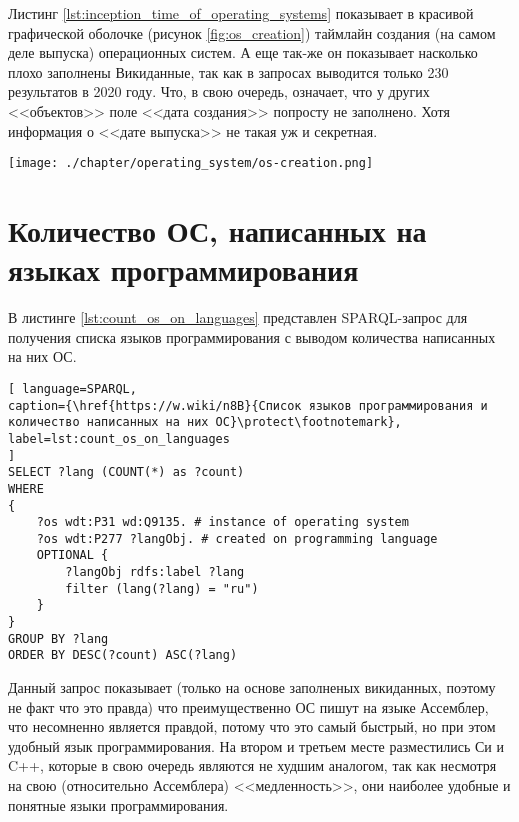Листинг \ref{lst:inception_time_of_operating_systems} показывает в красивой графической оболочке (рисунок \ref{fig:os_creation}) таймлайн создания (на самом деле выпуска) операционных систем. А еще так-же он показывает насколько плохо заполнены Викиданные, так как в запросах выводится только 230 результатов в 2020 году. Что, в свою очередь, означает, что у других <<объектов>> поле  <<дата создания>> попросту не заполнено. Хотя информация о <<дате выпуска>> не такая уж и секретная.


\begin{figure*}[h!]
	\texttt{[image: ./chapter/operating\_system/os-creation.png]}
	\caption{Часть таймлайна выпуска операционных систем на 2020 год.}
	\label{fig:os_creation}
\end{figure*}

\section{Количество ОС, написанных на языках программирования}
В листинге \ref{lst:count_os_on_languages} представлен SPARQL-запрос для получения списка языков программирования с выводом количества написанных на них ОС.


\begin{lstlisting}[ language=SPARQL, 
caption={\href{https://w.wiki/n8B}{Список языков программирования и количество написанных на них ОС}\protect\footnotemark},
label=lst:count_os_on_languages
]
SELECT ?lang (COUNT(*) as ?count)
WHERE 
{
	?os wdt:P31 wd:Q9135. # instance of operating system
	?os wdt:P277 ?langObj. # created on programming language
	OPTIONAL {
		?langObj rdfs:label ?lang
		filter (lang(?lang) = "ru")
	}
}
GROUP BY ?lang
ORDER BY DESC(?count) ASC(?lang)
\end{lstlisting}

Данный запрос показывает (только на основе заполненых викиданных, поэтому не факт что это правда) что преимущественно ОС пишут на языке Ассемблер, что несомненно является правдой, потому что это самый быстрый, но при этом удобный язык программирования. На втором и третьем месте разместились Си и C++, которые в свою очередь являются не худшим аналогом, так как несмотря на свою (относительно Ассемблера) <<медленность>>, они наиболее удобные и понятные языки программирования.


